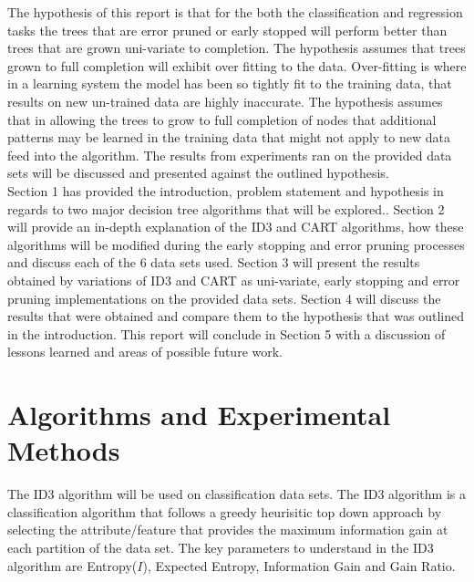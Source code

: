 \documentclass[twoside,11pt]{article}
\begin{document}
\hspace*{5mm} The hypothesis of this report is that for the both the classification and regression tasks the trees that are error pruned or early stopped will perform better than trees that are grown uni-variate to completion. The hypothesis assumes that trees grown to full completion will exhibit over fitting to the data. Over-fitting is where in a learning system the model has been so tightly fit to the training data, that results on new un-trained data are highly inaccurate. The hypothesis assumes that in allowing the trees to grow to full completion of nodes that additional patterns may be learned in the training data that might not apply to new data feed into the algorithm. The results from experiments ran on the provided data sets will be discussed and presented against the outlined hypothesis.\\

\hspace*{5mm} Section 1 has provided the introduction, problem statement and hypothesis in regards to two major decision tree algorithms that will be explored.. Section 2 will provide an in-depth explanation of the ID3 and CART algorithms, how these algorithms will be modified during the early stopping and error pruning processes and discuss each of the 6 data sets used. Section 3 will present the results obtained by variations of ID3 and CART as uni-variate, early stopping and error pruning implementations on the provided data sets. Section 4 will discuss the results that were obtained and compare them to the hypothesis that was outlined in the introduction. This report will conclude in Section 5 with a discussion of lessons learned and areas of possible future work.\\


\section{Algorithms and Experimental Methods}
\hspace*{10mm} The ID3 algorithm will be used on classification data sets. The ID3 algorithm is a classification algorithm that follows a greedy heurisitic top down approach by selecting the attribute/feature that provides the maximum information gain at each partition of the data set. The key parameters to understand in the ID3 algorithm are Entropy($I$), Expected Entropy, Information Gain and Gain Ratio.\\
\end{document}

